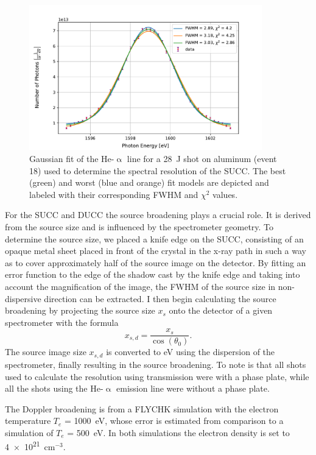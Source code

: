 \begin{figure}[H]
	\centering
	\includegraphics[width=0.9\textwidth]{Data_Analysis/resolution/peak_of_Al_event_18_on_SUCC.pdf}
	\caption{Gaussian fit of the He-$\upalpha$ line for a \SI{28}{\joule} shot on aluminum (event 18) used to determine the spectral resolution of the SUCC. The best (green) and worst (blue and orange) fit models are depicted and labeled with their corresponding FWHM and $\chi^2$ values.}
	\label{}
\end{figure}

For the SUCC and DUCC the source broadening plays a crucial role. It is derived from the source size and is influenced by the spectrometer geometry. To determine the source size, we placed a knife edge on the SUCC, consisting of an opaque metal sheet placed in front of the crystal in the x-ray path in such a way as to cover approximately half of the source image on the detector. By fitting an error function to the edge of the shadow cast by the knife edge and taking into account the magnification of the image, the FWHM of the source size in non-dispersive direction can be extracted. I then begin calculating the source broadening by projecting the source size $x_s$ onto the detector of a given spectrometer with the formula
\begin{equation}
	x_{s,d} = \frac{x_s}{\cos(\theta_0)}.
\end{equation}
The source image size $x_{s,d}$ is converted to eV using the dispersion of the spectrometer, finally resulting in the source broadening. To note is that all shots used to calculate the resolution using transmission were with a phase plate, while all the shots using the He-$\upalpha$ emission line were without a phase plate.

The Doppler broadening is from a FLYCHK simulation with the electron temperature $T_e$ = \SI{1000}{\electronvolt}, whose error is estimated from comparison to a simulation of $T_e$ = \SI{500}{\electronvolt}. In both simulations the electron density is set to \SI{4e21}{\centi\meter}$^{-3}$.

